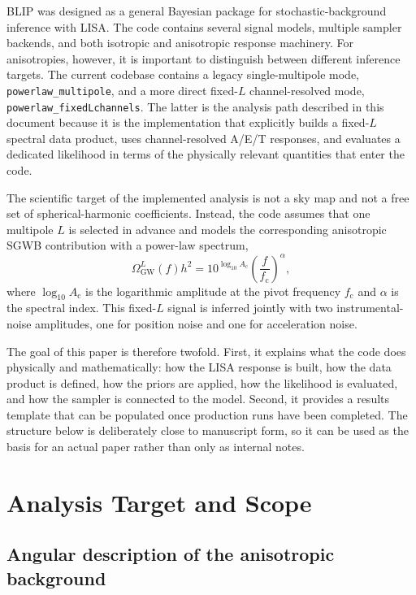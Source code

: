 \documentclass[11pt]{article}
\newcommand{\OmL}{\Omega_{\mathrm{GW}}^{L}}
\newcommand{\fc}{f_{\mathrm{c}}}
\begin{document}
BLIP was designed as a general Bayesian package for stochastic-background inference with LISA. The code contains several signal models, multiple sampler backends, and both isotropic and anisotropic response machinery. For anisotropies, however, it is important to distinguish between different inference targets. The current codebase contains a legacy single-multipole mode, \texttt{powerlaw\_multipole}, and a more direct fixed-$L$ channel-resolved mode, \texttt{powerlaw\_fixedLchannels}. The latter is the analysis path described in this document because it is the implementation that explicitly builds a fixed-$L$ spectral data product, uses channel-resolved A/E/T responses, and evaluates a dedicated likelihood in terms of the physically relevant quantities that enter the code.

The scientific target of the implemented analysis is not a sky map and not a free set of spherical-harmonic coefficients. Instead, the code assumes that one multipole $L$ is selected in advance and models the corresponding anisotropic SGWB contribution with a power-law spectrum,
\begin{equation}
  \OmL(f) h^2
  =
  10^{\log_{10} A_{\mathrm{c}}}
  \left(\frac{f}{\fc}\right)^{\alpha},
  \label{eq:intro-fixedL-spectrum}
\end{equation}
where $\log_{10} A_{\mathrm{c}}$ is the logarithmic amplitude at the pivot frequency $\fc$ and $\alpha$ is the spectral index. This fixed-$L$ signal is inferred jointly with two instrumental-noise amplitudes, one for position noise and one for acceleration noise.

The goal of this paper is therefore twofold. First, it explains what the code does physically and mathematically: how the LISA response is built, how the data product is defined, how the priors are applied, how the likelihood is evaluated, and how the sampler is connected to the model. Second, it provides a results template that can be populated once production runs have been completed. The structure below is deliberately close to manuscript form, so it can be used as the basis for an actual paper rather than only as internal notes.

\section{Analysis Target and Scope}

\subsection{Angular description of the anisotropic background}
\end{document}
